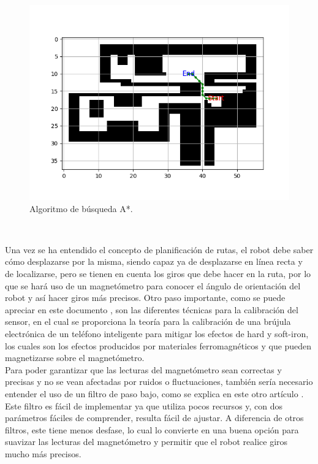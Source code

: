 \begin{figure} [H]
  \begin{center}
    \includegraphics[scale=0.4]{figs/astar}
  \end{center}
  \caption{Algoritmo de búsqueda A*.}
  \label{fig:astar}
\end{figure}\

Una vez se ha entendido el concepto de planificación de rutas, el robot debe saber cómo desplazarse por la misma, siendo capaz ya de desplazarse en línea recta y de localizarse, pero se tienen en cuenta los giros que debe hacer en la ruta, por lo que se hará uso de un magnetómetro para conocer el ángulo de orientación del robot y así hacer giros más precisos. Otro paso importante, como se puede apreciar en este documento \cite{Ozyagcilar2015}, son las diferentes técnicas para la calibración del sensor, en el cual se proporciona la teoría para la calibración de una brújula electrónica de un teléfono inteligente para mitigar los efectos de hard y soft-iron, los cuales son los efectos producidos por materiales ferromagnéticos y que pueden magnetizarse sobre el magnetómetro.\\

Para poder garantizar que las lecturas del magnetómetro sean correctas y precisas y no se vean afectadas por ruidos o fluctuaciones, también sería necesario entender el uso de un filtro de paso bajo, como se explica en este otro artículo \cite{low_pass_filter}. Este filtro es fácil de implementar ya que utiliza pocos recursos y, con dos parámetros fáciles de comprender, resulta fácil de ajustar. A diferencia de otros filtros, este tiene menos desfase, lo cual lo convierte en una buena opción para suavizar las lecturas del magnetómetro y permitir que el robot realice giros mucho más precisos.



\vspace{15cm} %







